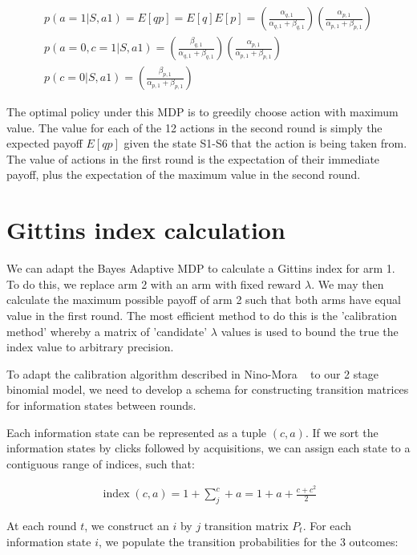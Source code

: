\documentclass[11pt,a4,singlespacing,titlepagenumber=on]{scrreprt}
\numberwithin{equation}{chapter} %
\theoremstyle{remark}
\begin{document}
\begin{align}
	p(a=1|S,a1) = E[qp] = E[q]E[p] = 
		\left( \frac{ \alpha_{q,1} }{ \alpha_{q,1} + \beta_{q,1} } \right)
		\left( \frac{ \alpha_{p,1} }{ \alpha_{p,1} + \beta_{p,1} } \right) \\
	p(a=0,c=1|S,a1) = 
		\left( \frac{ \beta_{q,1} }{ \alpha_{q,1} + \beta_{q,1} } \right)
		\left( \frac{ \alpha_{p,1} }{ \alpha_{p,1} + \beta_{p,1} } \right) \\
	p(c=0|S,a1) = 
		\left( \frac{ \beta_{p,1} }{ \alpha_{p,1} + \beta_{p,1} } \right) 
\end{align}	

The optimal policy under this MDP is to greedily choose action with maximum value. The value for each of the 12 actions in the second round is simply the expected payoff $E[qp]$ given the state S1-S6 that the action is being taken from. The value of actions in the first round is the expectation of their immediate payoff, plus the expectation of the maximum value in the second round.

\section{Gittins index calculation}

We can adapt the Bayes Adaptive MDP to calculate a Gittins index for arm 1. To do this, we replace arm 2 with an arm with fixed reward $\lambda$. We may then calculate the maximum possible payoff of arm 2 such that both arms have equal value in the first round. The most efficient method to do this is the 'calibration method' whereby a matrix of 'candidate' $\lambda$ values is used to bound the true the index value to arbitrary precision.

To adapt the calibration algorithm described in Nino-Mora ~\cite{nino2011computing} to our 2 stage binomial model, we need to develop a schema for constructing transition matrices for information states between rounds.

Each information state can be represented as a tuple $(c,a)$. If we sort the information states by clicks followed by acquisitions, we can assign each state to a contiguous range of indices, such that:

\begin{align}
	\operatorname{index}(c,a) = 1 + \sum_j^c + a = 1 + a + \frac{c + c^2}{2} 
\end{align}

At each round $t$, we construct an $i$ by $j$ transition matrix $P_t$. For each information state $i$, we populate the transition probabilities for the 3 outcomes:
\end{document}
